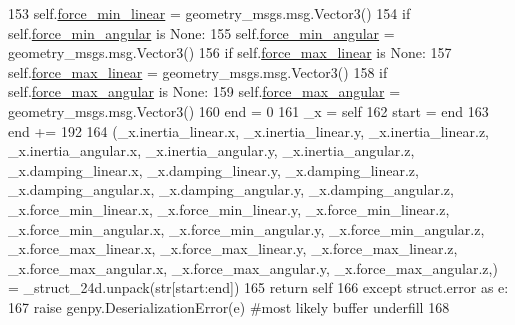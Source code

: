 \begin{DoxyCode}
153         self.\hyperlink{classjaco__msgs_1_1srv_1_1__SetForceControlParams_1_1SetForceControlParamsRequest_a8cfd79fa02dd2f62d84811d5f04693b1}{force\_min\_linear} = geometry\_msgs.msg.Vector3()
154       \textcolor{keywordflow}{if} self.\hyperlink{classjaco__msgs_1_1srv_1_1__SetForceControlParams_1_1SetForceControlParamsRequest_a059ff47ab34fd7730218c1a609bbb956}{force\_min\_angular} \textcolor{keywordflow}{is} \textcolor{keywordtype}{None}:
155         self.\hyperlink{classjaco__msgs_1_1srv_1_1__SetForceControlParams_1_1SetForceControlParamsRequest_a059ff47ab34fd7730218c1a609bbb956}{force\_min\_angular} = geometry\_msgs.msg.Vector3()
156       \textcolor{keywordflow}{if} self.\hyperlink{classjaco__msgs_1_1srv_1_1__SetForceControlParams_1_1SetForceControlParamsRequest_aae9888fc8efdf00c292dfaf866c90f7f}{force\_max\_linear} \textcolor{keywordflow}{is} \textcolor{keywordtype}{None}:
157         self.\hyperlink{classjaco__msgs_1_1srv_1_1__SetForceControlParams_1_1SetForceControlParamsRequest_aae9888fc8efdf00c292dfaf866c90f7f}{force\_max\_linear} = geometry\_msgs.msg.Vector3()
158       \textcolor{keywordflow}{if} self.\hyperlink{classjaco__msgs_1_1srv_1_1__SetForceControlParams_1_1SetForceControlParamsRequest_a1e80687d03a465ee0a3b22923e11d7d1}{force\_max\_angular} \textcolor{keywordflow}{is} \textcolor{keywordtype}{None}:
159         self.\hyperlink{classjaco__msgs_1_1srv_1_1__SetForceControlParams_1_1SetForceControlParamsRequest_a1e80687d03a465ee0a3b22923e11d7d1}{force\_max\_angular} = geometry\_msgs.msg.Vector3()
160       end = 0
161       \_x = self
162       start = end
163       end += 192
164       (\_x.inertia\_linear.x, \_x.inertia\_linear.y, \_x.inertia\_linear.z, \_x.inertia\_angular.x, 
      \_x.inertia\_angular.y, \_x.inertia\_angular.z, \_x.damping\_linear.x, \_x.damping\_linear.y, \_x.damping\_linear.z, 
      \_x.damping\_angular.x, \_x.damping\_angular.y, \_x.damping\_angular.z, \_x.force\_min\_linear.x, \_x.force\_min\_linear.y, 
      \_x.force\_min\_linear.z, \_x.force\_min\_angular.x, \_x.force\_min\_angular.y, \_x.force\_min\_angular.z, \_x.force\_max\_linear.x, 
      \_x.force\_max\_linear.y, \_x.force\_max\_linear.z, \_x.force\_max\_angular.x, \_x.force\_max\_angular.y, 
      \_x.force\_max\_angular.z,) = \_struct\_24d.unpack(str[start:end])
165       \textcolor{keywordflow}{return} self
166     \textcolor{keywordflow}{except} struct.error \textcolor{keyword}{as} e:
167       \textcolor{keywordflow}{raise} genpy.DeserializationError(e) \textcolor{comment}{#most likely buffer underfill}
168 
\end{DoxyCode}
